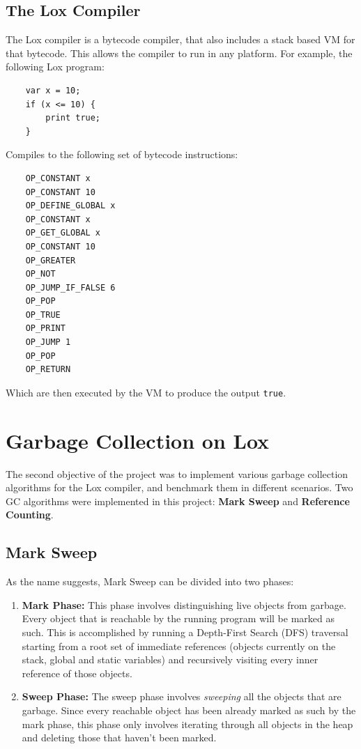 \documentclass[10pt]{extarticle}
\begin{document}
\subsection{The Lox Compiler}

The Lox compiler is a bytecode compiler, that also includes a stack based VM for that bytecode. This allows the compiler to run in any platform. For example, the following Lox program: 

\begin{lstlisting}
    var x = 10;
    if (x <= 10) {
        print true;
    }
\end{lstlisting}
Compiles to the following set of bytecode instructions:
\begin{lstlisting}
    OP_CONSTANT x
    OP_CONSTANT 10
    OP_DEFINE_GLOBAL x
    OP_CONSTANT x
    OP_GET_GLOBAL x
    OP_CONSTANT 10
    OP_GREATER
    OP_NOT
    OP_JUMP_IF_FALSE 6
    OP_POP
    OP_TRUE
    OP_PRINT
    OP_JUMP 1
    OP_POP
    OP_RETURN
\end{lstlisting}
Which are then executed by the VM to produce the output \lstinline{true}.

\section{Garbage Collection on Lox}

The second objective of the project was to implement various garbage collection algorithms for the Lox compiler, and benchmark them in different scenarios. Two GC algorithms were implemented in this project: \textbf{Mark Sweep} and \textbf{Reference Counting}.

\subsection{Mark Sweep}

As the name suggests, Mark Sweep can be divided into two phases: 

\begin{enumerate}
    \item \textbf{Mark Phase:} This phase involves distinguishing live objects from garbage. Every object that is reachable by the running program will be marked as such. This is accomplished by running a Depth-First Search (DFS) traversal starting from a root set of immediate references (objects currently on the stack, global and static variables) and recursively visiting every inner reference of those objects. 

    \item \textbf{Sweep Phase:} The sweep phase involves \textit{sweeping} all the objects that are garbage. Since every reachable object has been already marked as such by the mark phase, this phase only involves iterating through all objects in the heap and deleting those that haven't been marked.
    
\end{enumerate}
\end{document}
